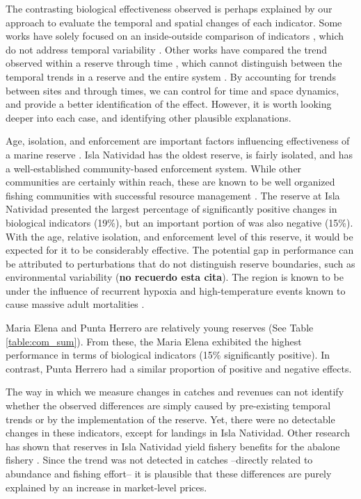 \documentclass{frontiersSCNS}
\theoremstyle{definition}
\theoremstyle{definition}
\theoremstyle{definition}
\theoremstyle{remark}
\begin{document}
The contrasting biological effectiveness observed is perhaps explained
by our approach to evaluate the temporal and spatial changes of each
indicator. Some works have solely focused on an inside-outside
comparison of indicators
\citep{guidetti_2014-8Z,friedlander_2017-oI,rodriguez_2017-PD}, which do
not address temporal variability \citep{depalma_2018}. Other works have
compared the trend observed within a reserve through time
\citep{betti_2017-lq}, which cannot distinguish between the temporal
trends in a reserve and the entire system \citep{depalma_2018}. By
accounting for trends between sites and through times, we can control
for time and space dynamics, and provide a better identification of the
effect. However, it is worth looking deeper into each case, and
identifying other plausible explanations.

Age, isolation, and enforcement are important factors influencing
effectiveness of a marine reserve \citep{edgar_2014-UO}. Isla Natividad
has the oldest reserve, is fairly isolated, and has a well-established
community-based enforcement system. While other communities are
certainly within reach, these are known to be well organized fishing
communities with successful resource management
\citep{mccay_2017-1m,mccay_2014-CN}. The reserve at Isla Natividad
presented the largest percentage of significantly positive changes in
biological indicators (19\%), but an important portion of was also
negative (15\%). With the age, relative isolation, and enforcement level
of this reserve, it would be expected for it to be considerably
effective. The potential gap in performance can be attributed to
perturbations that do not distinguish reserve boundaries, such as
environmental variability (\textbf{no recuerdo esta cita}). The region
is known to be under the influence of recurrent hypoxia and
high-temperature events known to cause massive adult mortalities
\citep{micheli_2012-EU}.

Maria Elena and Punta Herrero are relatively young reserves (See Table
\ref{table:com_sum}). From these, the Maria Elena exhibited the highest
performance in terms of biological indicators (15\% significantly
positive). In contrast, Punta Herrero had a similar proportion of
positive and negative effects.

The way in which we measure changes in catches and revenues can not
identify whether the observed differences are simply caused by
pre-existing temporal trends or by the implementation of the reserve.
Yet, there were no detectable changes in these indicators, except for
landings in Isla Natividad. Other research has shown that reserves in
Isla Natividad yield fishery benefits for the abalone fishery
\citep{rossetto_2015-V0}. Since the trend was not detected in catches
--directly related to abundance and fishing effort-- it is plausible
that these differences are purely explained by an increase in
market-level prices.
\end{document}
